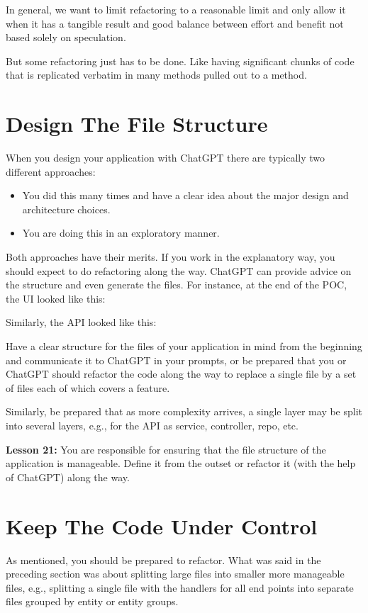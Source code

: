 \documentclass[runningheads]{llncs}
\begin{document}
In general, we want to limit refactoring to a reasonable limit and only allow it when it has a tangible result and good balance between effort and benefit not based solely on speculation.

But some refactoring just has to be done. Like having significant chunks of code that is replicated verbatim in many methods pulled out to a method.

\section{Design The File Structure}
When you design your application with ChatGPT there are typically two different approaches:
\begin{itemize}
    \item You did this many times and have a clear idea about the major design and architecture choices.
    \item You are doing this in an exploratory manner.
\end{itemize}

Both approaches have their merits. If you work in the explanatory way, you should expect to do refactoring along the way. ChatGPT can provide advice on the structure and even generate the files. For instance, at the end of the POC, the UI looked like this:

Similarly, the API looked like this:

Have a clear structure for the files of your application in mind from the beginning and communicate it to ChatGPT in your prompts, or be prepared that you or ChatGPT should refactor the code along the way to replace a single file by a set of files each of which covers a feature.

Similarly, be prepared that as more complexity arrives, a single layer may be split into several layers, e.g., for the API as service, controller, repo, etc.

\textbf{Lesson 21:} You are responsible for ensuring that the file structure of the application is manageable. Define it from the outset or refactor it (with the help of ChatGPT) along the way.

\section{Keep The Code Under Control}
As mentioned, you should be prepared to refactor. What was said in the preceding section was about splitting large files into smaller more manageable files, e.g., 
splitting a single file with the handlers for all end points into separate files grouped by entity or entity groups.
\end{document}
